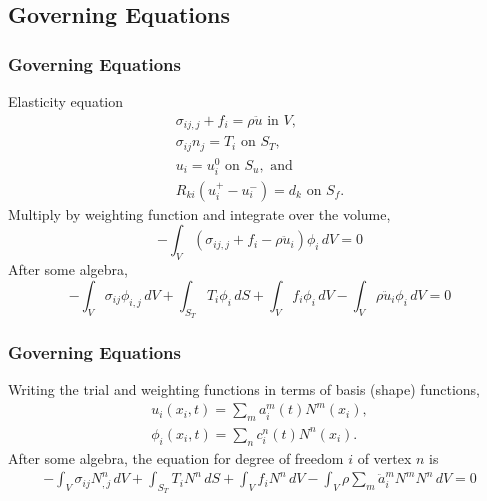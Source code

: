 \documentclass{beamer}
\begin{document}
\subsection{Governing Equations}

\begin{frame}
  \frametitle{Governing Equations}
  \summary{}

  \vfill
  Elasticity equation
  \begin{gather}
    \sigma_{ij,j} + f_i = \rho \ddot{u} \text{ in } V, \\
    \sigma_{ij} n_j = T_i \text{ on } S_T, \\
    u_i = u_i^0 \text{ on } S_u, \text{ and } \\
    R_{ki}(u^{+}_i - u^{-}_i) = d_k \text{ on } S_f.
  \end{gather}
  Multiply by weighting function and integrate over the volume,
  \begin{equation}
    -\int_V (\sigma_{ij,j} + f_i - \rho \ddot{u}_i) \phi_i \, dV = 0
  \end{equation}
  After some algebra,
  \begin{equation}
    -\int_V \sigma_{ij} \phi_{i,j} \, dV 
    + \int_{S_T} T_i \phi_i\, dS
    + \int_V f_i \phi_i \, dV 
    - \int_V \rho \ddot{u}_i \phi_i \, dV = 0
  \end{equation}
  \vfill
  
\end{frame}


\begin{frame}
  \frametitle{Governing Equations}
  \summary{}

  \vfill
  Writing the trial and weighting functions in terms of basis (shape)
  functions,
  \begin{gather}
    u_i(x_i, t) = \sum_m a^m_i(t) N^m(x_i), \\
    \phi_i(x_i, t) = \sum_n c^n_i(t) N^n(x_i).
  \end{gather}
  After some algebra, the equation for degree of freedom $i$ of
  vertex $n$ is
  \begin{multline}
    -\int_V \sigma_{ij} N^n_{,j} \, dV 
    + \int_{S_T} T_i N^n \, dS
    + \int_V f_i N^n \, dV 
    - \int_V \rho \sum_m \ddot{a}^m_i N^m N^n \, dV = 0
  \end{multline}
  \vfill

\end{frame}
\end{document}
